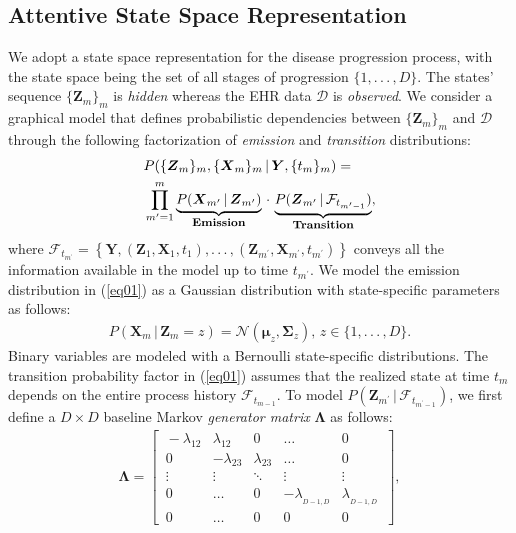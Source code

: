 \documentclass[twoside,11pt]{article}
\begin{document}
\subsection{Attentive State Space Representation}
\label{Sec32}
We adopt a state space representation for the disease progression process, with the state space being the set of all stages of progression \mbox{\footnotesize $\{1,.\,.\,.\,,D\}$}. The states' sequence \mbox{\footnotesize $\{\boldsymbol{Z}_m\}_m$} is {\it hidden} whereas the EHR data \mbox{\footnotesize $\boldsymbol{\mathcal{D}}$} is {\it observed}. We consider a graphical model that defines probabilistic dependencies between \mbox{\footnotesize $\{\boldsymbol{Z}_m\}_m$} and \mbox{\footnotesize $\boldsymbol{\mathcal{D}}$} through the following factorization of {\it emission} and {\it transition} distributions: 
\begin{align}
&P(\{\boldsymbol{Z}_m\}_m,\{\boldsymbol{X}_m\}_m\,|\,\boldsymbol{Y},\{t_m\}_m) = \nonumber \\ 
&\prod^{m}_{m^{\prime}=1} \underbrace{P(\boldsymbol{X}_{m^{\prime}}\,|\,\boldsymbol{Z}_{m^{\prime}})}_{\mbox{\footnotesize \textbf{Emission}}}\,\cdot\,\underbrace{P(\boldsymbol{Z}_{m^{\prime}}\,|\,\mathcal{F}_{t_{m^{\prime}-1}})}_{\mbox{\footnotesize \textbf{Transition}}}, 
\label{eq01}
\end{align}
where \mbox{\footnotesize $\mathcal{F}_{t_{m^{\prime}}} = \left\{\boldsymbol{Y},(\boldsymbol{Z}_1,\boldsymbol{X}_1,t_{1}),.\,.\,.\,,(\boldsymbol{Z}_{m^{\prime}},\boldsymbol{X}_{m^{\prime}},t_{m^{\prime}})\right\}$} conveys all the information available in the model up to time \mbox{\footnotesize $t_{m^{\prime}}$}. We model the emission distribution in (\ref{eq01}) as a Gaussian distribution with state-specific parameters as follows: 
\begin{align}
P(\boldsymbol{X}_{m}\,|\,\boldsymbol{Z}_{m}=z) = \mathcal{N}(\boldsymbol{\mu}_z, \boldsymbol{\Sigma}_z),\, z \in \{1,.\,.\,.\,,D\}. 
\label{eq01Z}
\end{align} 
Binary variables are modeled with a Bernoulli state-specific distributions. The transition probability factor in (\ref{eq01}) assumes that the realized state at time \mbox{\footnotesize $t_{m}$} depends on the entire process history \mbox{\footnotesize $\mathcal{F}_{t_{m-1}}$}. To model \mbox{\footnotesize $P(\boldsymbol{Z}_{m^{\prime}}\,|\,\mathcal{F}_{t_{m^{\prime}-1}})$}, we first define a \mbox{\footnotesize $D \times D$} baseline Markov {\it generator matrix} \mbox{\footnotesize $\boldsymbol{\Lambda}$} as follows: 
\begin{align}
\boldsymbol{\Lambda} = \begin{bmatrix}
\, -\lambda_{12} & \lambda_{12} &  0  & \ldots & 0 \, \\
\, 0  & -\lambda_{23} & \lambda_{23} & \ldots & 0 \, \\
\, \vdots & \vdots & \ddots & \vdots & \vdots \, \\
\, 0 & \ldots & 0 & -\lambda_{_{D-1,D}} & \lambda_{_{D-1,D}} \, \\
\, 0 & \ldots &  0 & 0 & 0 \,
  \end{bmatrix}, 
\label{eq000}
\end{align}
\end{document}
